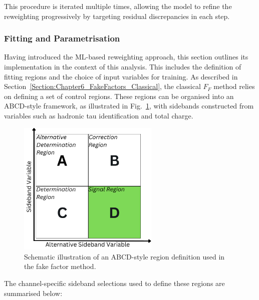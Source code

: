 This procedure is iterated multiple times, allowing the model to refine the reweighting progressively by targeting residual discrepancies in each step.

\subsubsection{Fitting and Parametrisation}
\label{Section6:Fitting_Parametrisation}
Having introduced the \ac{ML}-based reweighting approach, this section outlines its implementation in the context of this analysis. This includes the definition of fitting regions and the choice of input variables for training. As described in Section~\ref{Section:Chapter6_FakeFactors_Classical}, the classical $F_F$ method relies on defining a set of control regions. These regions can be organised into an ABCD-style framework, as illustrated in Fig.~\ref{Figure:Chapter6_ABCD}, with sidebands constructed from variables such as hadronic tau identification and total charge.

\begin{figure}[!htbp]
\centering
\includegraphics[width=0.6\textwidth]{Figures/Chapter6/ABCD.pdf}
\caption[ABCD-style region definition for fake factor estimation.]{Schematic illustration of an ABCD-style region definition used in the fake factor method.}
\label{Figure:Chapter6_ABCD}
\end{figure}

The channel-specific sideband selections used to define these regions are summarised below:

